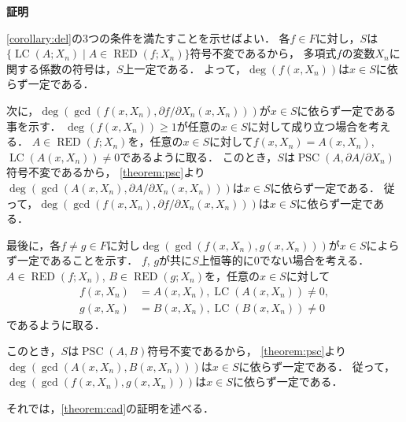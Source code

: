 \documentclass[uplatex, dvipdfmx]{jsarticle}
\makeatletter
\numberwithin{equation}{section}
\renewenvironment{proof}[1][\proofname]{\par
  \pushQED{\qed}%
  \normalfont \topsep6\p@\@plus6\p@\relax
  \trivlist
  \item\relax
  {\bfseries
  #1\@addpunct{.}}\hspace\labelsep\ignorespaces
}{
  \popQED\endtrivlist\@endpefalse
}
\DeclareMathOperator{\PSC}{PSC}
\DeclareMathOperator{\RED}{RED}
\DeclareMathOperator{\LC}{LC}
\theoremstyle{definition}
\renewcommand{\proofname}{\textbf{証明}}
\makeatother
\begin{document}
\begin{proof}
     \cref{corollary:del}の$3$つの条件を満たすことを示せばよい．
     各$f \in F$に対し，$S$は$\{\LC(A; X_n) \mid A \in \RED(f;X_n) \}$符号不変であるから，
     多項式$f$の変数$X_n$に関する係数の符号は，$S$上一定である．
     よって，$\deg(f(x, X_n))$は$x \in S$に依らず一定である．

     次に，$\deg(\gcd(f(x, X_n), \partial f / \partial X_n(x, X_n)))$が$x \in S$に依らず一定である事を示す．
     $\deg(f(x, X_n)) \geq 1$が任意の$x \in S$に対して成り立つ場合を考える．
     $A \in \RED(f;X_n)$を，任意の$x \in S$に対して$f(x, X_n) = A(x,X_n)$, $\LC(A(x,X_n)) \neq 0$であるように取る．
     このとき，$S$は$\PSC(A, \partial A / \partial X_n)$符号不変であるから，
     \cref{theorem:psc}より$\deg(\gcd(A(x, X_n), \partial A / \partial X_n(x, X_n)))$は$x\in S$に依らず一定である．
     従って，$\deg(\gcd(f(x, X_n), \partial f / \partial X_n(x, X_n)))$は$x\in S$に依らず一定である．
     
     最後に，各$f \neq g \in F$に対し$\deg(\gcd(f(x, X_n),g(x,X_n)))$が$x \in S$によらず一定であることを示す．
     $f$, $g$が共に$S$上恒等的に$0$でない場合を考える．
     $A \in \RED(f;X_n)$, $B \in \RED(g;X_n)$を，任意の$x \in S$に対して
     \begin{align}
          f(x, X_n) &= A(x,X_n), \LC(A(x,X_n)) \neq 0,\\
          g(x, X_n) &= B(x, X_n), \LC(B(x,X_n)) \neq 0
     \end{align}
     であるように取る．
     
     このとき，$S$は$\PSC(A, B)$符号不変であるから，
     \cref{theorem:psc}より$\deg(\gcd(A(x, X_n), B(x, X_n)))$は$x\in S$に依らず一定である．
     従って，$\deg(\gcd(f(x, X_n), g(x, X_n)))$は$x\in S$に依らず一定である．
\end{proof}

それでは，\cref{theorem:cad}の証明を述べる．
\end{document}
